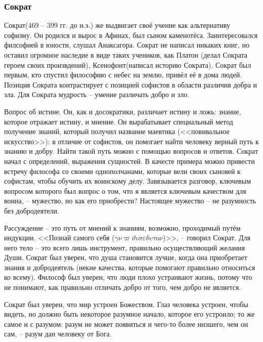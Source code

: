 \documentclass[a4paper, 12pt]{book} %
\begin{document}
\subsubsection{Сократ}

Сократ(469 -- 399 гг. до н.э.) же выдвигает своё учение как альтернативу софизму. Он родился и вырос в Афинах, был сыном каменотёса. Заинтересовался филсофией в юности, слушал Анаксагора. Сократ не написал никаких книг, но оставил огромное наследие в виде таких учеников, как Платон (делал Сократа героем своих произвдений), Ксенофонт(написал историю Сократа). Сократ был первым, кто спустил философию с небес на землю, привёл её в дома людей. Позиция Сократа контрастирует с позицией софистов в области различия добра и зла. Для Сократа мудрость -- умение различать добро и зло. 

Вопрос об истине. Он, как и досократики, различает истину и ложь: знание, которое отражает истину, и мнение. Он вырабатывает специальный метод получение знаний, который получил название маевтика (<<повивальное искусство>>): в отличие от софистов, он помогает найти человеку верный путь к знанию и добру. Найти такой путь можно с помощью вопросов и ответов. Сократ начал с определений, выражения сущностей. В качесте примера можно привести встречу философа со своими однополчанами, которые вели своих сыновей к софистам, чтобы обучить их воинскому делу. Завязывается разговор, ключевым вопросом которого был вопрос о том, что я является ключевым качеством для воина, -- мужество, но как его приобрести? Настоящее мужество -- не разумность без добродеятели.

Рассуждение -- это путь от мнений к знаниям, возможно, проходимый путём индукции. <<Познай самого себя ($\gamma \nu \varpi \vartheta \iota \sigma \varepsilon \delta \upsilon \tau o \nu$)>>, -- говорил Сократ. Для него тело -- это всего лишь инструмент, правильно осуществляющий желания Души. Сократ был уверен, что душа становится лучше, когда она приобретает знания и добродеятель (некие качества, которые помогают правильно относиться ко всему). Философ был уверен, что люди плохо устраивают жизнь, потому что не понимают, как правильно отличать добро от того, чем добро не является.

Сократ был уверен, что мир устроен Божеством. Глаз человека устроен, чтобы видеть, но должно быть некоторое разумное начало, которое его устроило; то же самое и с разумом: разум не может появиться и чего-то более низшего, чем он сам, -- разум дан человеку от Бога.
\end{document}
